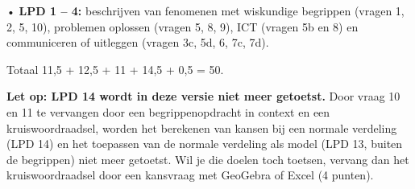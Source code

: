 \documentclass{article}
\begin{document}
\begin{docentenpagina}
\begin{oplossing}
• \textbf{LPD 1 – 4:} beschrijven van fenomenen met wiskundige begrippen (vragen 1, 2, 5, 10), problemen oplossen (vragen 5, 8, 9), ICT (vragen 5b en 8) en communiceren of uitleggen (vragen 3c, 5d, 6, 7c, 7d).

Totaal 11,5 + 12,5 + 11 + 14,5 + 0,5 = 50.
\end{oplossing}

\begin{oplossing}
\textbf{Let op: LPD 14 wordt in deze versie niet meer getoetst.} Door vraag 10 en 11 te vervangen door een begrippenopdracht in context en een kruiswoordraadsel, worden het berekenen van kansen bij een normale verdeling (LPD 14) en het toepassen van de normale verdeling als model (LPD 13, buiten de begrippen) niet meer getoetst. Wil je die doelen toch toetsen, vervang dan het kruiswoordraadsel door een kansvraag met GeoGebra of Excel (4 punten).
\end{oplossing}

\end{docentenpagina}
\end{document}
